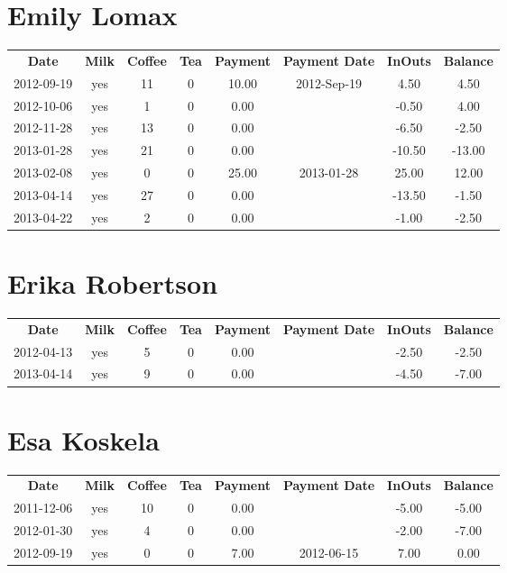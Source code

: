 \section{Emily Lomax}

\begin{center}
\begin{tabular}{cccccccc}
\textbf{Date} & \textbf{Milk} & \textbf{Coffee} & \textbf{Tea} & \textbf{Payment} & \textbf{Payment Date} & \textbf{InOuts} & \textbf{Balance} \\
2012-09-19 & yes & 11 & 0 & 10.00 & 2012-Sep-19 &   4.50 &   4.50\\ 
2012-10-06 & yes &  1 & 0 &  0.00 &  &  -0.50 &   4.00\\ 
2012-11-28 & yes & 13 & 0 &  0.00 &  &  -6.50 &  -2.50\\ 
2013-01-28 & yes & 21 & 0 &  0.00 &  & -10.50 & -13.00\\ 
2013-02-08 & yes &  0 & 0 & 25.00 & 2013-01-28 &  25.00 &  12.00\\ 
2013-04-14 & yes & 27 & 0 &  0.00 &  & -13.50 &  -1.50\\ 
2013-04-22 & yes &  2 & 0 &  0.00 &  &  -1.00 &  -2.50
\end{tabular}
\end{center}

\section{Erika Robertson}

\begin{center}
\begin{tabular}{cccccccc}
\textbf{Date} & \textbf{Milk} & \textbf{Coffee} & \textbf{Tea} & \textbf{Payment} & \textbf{Payment Date} & \textbf{InOuts} & \textbf{Balance} \\
2012-04-13 & yes & 5 & 0 & 0.00 &  & -2.50 & -2.50\\ 
2013-04-14 & yes & 9 & 0 & 0.00 &  & -4.50 & -7.00
\end{tabular}
\end{center}

\section{Esa Koskela}

\begin{center}
\begin{tabular}{cccccccc}
\textbf{Date} & \textbf{Milk} & \textbf{Coffee} & \textbf{Tea} & \textbf{Payment} & \textbf{Payment Date} & \textbf{InOuts} & \textbf{Balance} \\
2011-12-06 & yes & 10 & 0 & 0.00 &  & -5.00 & -5.00\\ 
2012-01-30 & yes &  4 & 0 & 0.00 &  & -2.00 & -7.00\\ 
2012-09-19 & yes &  0 & 0 & 7.00 & 2012-06-15 &  7.00 &  0.00
\end{tabular}
\end{center}

